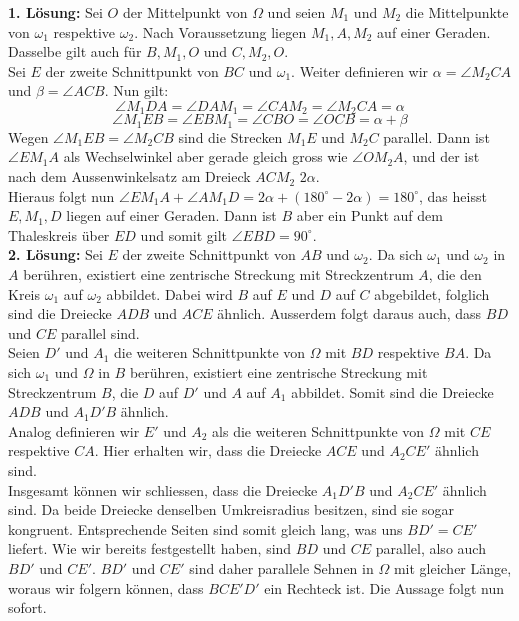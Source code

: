 \documentclass[a4paper]{article}
\begin{document}
\textbf{1. Lösung:} Sei $O$ der Mittelpunkt von $\Omega$ und seien $M_1$ und $M_2$ die Mittelpunkte von $\omega_1$ respektive $\omega_2$. Nach Voraussetzung liegen $M_1,A,M_2$ auf einer Geraden. Dasselbe gilt auch für $B,M_1,O$ und $C,M_2,O$.\\
Sei $E$ der zweite Schnittpunkt von $BC$ und $\omega_1$. Weiter definieren wir $\alpha=\angle M_2CA$ und $\beta=\angle ACB$. Nun gilt:
\[\angle M_1DA=\angle DAM_1=\angle CAM_2=\angle M_2CA=\alpha\]
\[\angle M_1EB=\angle EBM_1=\angle CBO=\angle OCB=\alpha+\beta\]
Wegen $\angle M_1EB=\angle M_2CB$ sind die Strecken $M_1E$ und $M_2C$ parallel. Dann ist $\angle EM_1A$ als Wechselwinkel aber gerade gleich gross wie $\angle OM_2A$, und der ist nach dem Aussenwinkelsatz am Dreieck $ACM_2$ $2\alpha$.\\
Hieraus folgt nun $\angle EM_1A+\angle AM_1D=2\alpha+(180^\circ-2\alpha)=180^\circ$, das heisst $E,M_1,D$ liegen auf einer Geraden. Dann ist $B$ aber ein Punkt auf dem Thaleskreis über $ED$ und somit gilt $\angle EBD=90^\circ$.\\

\textbf{2. Lösung:} Sei $E$ der zweite Schnittpunkt von $AB$ und $\omega_2$. Da sich $\omega_1$ und $\omega_2$ in $A$ berühren, existiert eine zentrische Streckung mit Streckzentrum $A$, die den Kreis $\omega_1$ auf $\omega_2$ abbildet. Dabei wird $B$ auf $E$ und $D$ auf $C$ abgebildet, folglich sind die Dreiecke $ADB$ und $ACE$ ähnlich. Ausserdem folgt daraus auch, dass $BD$ und $CE$ parallel sind.\\
Seien $D'$ und $A_1$ die weiteren Schnittpunkte von $\Omega$ mit $BD$ respektive $BA$. Da sich $\omega_1$ und $\Omega$ in $B$ berühren, existiert eine zentrische Streckung mit Streckzentrum $B$, die $D$ auf $D'$ und $A$ auf $A_1$ abbildet. Somit sind die Dreiecke $ADB$ und $A_1D'B$ ähnlich.\\
Analog definieren wir $E'$ und $A_2$ als die weiteren Schnittpunkte von $\Omega$ mit $CE$ respektive $CA$. Hier erhalten wir, dass die Dreiecke $ACE$ und $A_2CE'$ ähnlich sind.\\
Insgesamt können wir schliessen, dass die Dreiecke $A_1D'B$ und $A_2CE'$ ähnlich sind. Da beide Dreiecke denselben Umkreisradius besitzen, sind sie sogar kongruent. Entsprechende Seiten sind somit gleich lang, was uns $BD'=CE'$ liefert. Wie wir bereits festgestellt haben, sind $BD$ und $CE$ parallel, also auch $BD'$ und $CE'$. $BD'$ und $CE'$ sind daher parallele Sehnen in $\Omega$ mit gleicher Länge, woraus wir folgern können, dass $BCE'D'$ ein Rechteck ist. Die Aussage folgt nun sofort.
\end{document}
